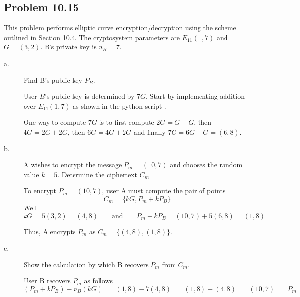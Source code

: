 \documentclass[../hw_sols.tex]{subfiles}
\begin{document}
\newpage



\subsection*{Problem 10.15}

This problem performs elliptic curve encryption/decryption using the scheme 
outlined in Section 10.4. The cryptosystem parameters are $E_{11}(1, 7)$ and 
$G = (3,2)$. B's private key is $n_B = 7$.

\begin{description}

\item[a.] Find B's public key $P_B$.

\begin{solution}
User $B$'s public key is determined by $7G$. Start by implementing addition 
over $E_{11}(1,7)$ as shown in the python script 
.



One way to compute $7G$ is to first compute $2G = G + G$, then 
$4G = 2G + 2G$, then $6G = 4G + 2G$ and finally $7G = 6G + G = (6,8)$.
\end{solution}

\item[b.] A wishes to encrypt the message $P_m = (10,7)$ and chooses the 
random value $k = 5$. Determine the ciphertext $C_m$.

\begin{solution}
To encrypt $P_m = (10,7)$, user A must compute the pair of points
	\[ C_m = \{kG, P_m + kP_B\} \]
Well 
	\[ kG = 5 (3,2) = (4,8)
	\qquad \text{and} \qquad
	P_m + kP_B = (10,7) + 5(6,8) = (1,8) \]

Thus, A encrypts $P_m$ as $C_m = \{(4,8),(1,8)\}$.
\end{solution}

\item[c.] Show the calculation by which B recovers $P_m$ from $C_m$.

\begin{solution}
User B recovers $P_m$ as follows
	\[ (P_m + kP_B) - n_B(kG) \; 
	= \; (1,8) - 7(4,8) \; 
	= \; (1,8) - (4,8) \; 
	= \; (10,7) \; = \; P_m \]
\end{solution}

\end{description}
\end{document}
